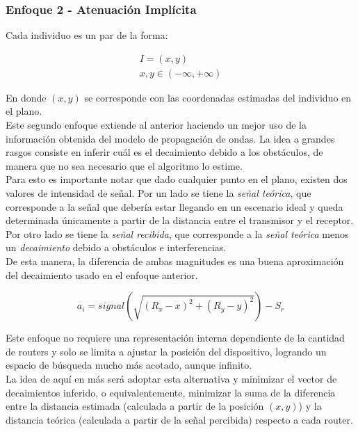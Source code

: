 \documentclass[journal]{IEEEtran}
\begin{document}
\subsubsection{Enfoque 2 - Atenuación Implícita}

Cada individuo es un par de la forma:

\begin{gather*}
I = (x, y)\\
x, y \in (-\infty, +\infty)
\end{gather*}

En donde $(x,y)$ se corresponde con las coordenadas estimadas del individuo en el plano.\\

Este segundo enfoque extiende al anterior haciendo un mejor uso de la información obtenida del modelo de propagación de ondas. La idea a grandes rasgos consiste en inferir cuál es el decaimiento debido a los obstáculos, de manera que no sea necesario que el algoritmo lo estime.\\

Para esto es importante notar que dado cualquier punto en el plano, existen dos valores de intensidad de señal. Por un lado se tiene la \emph{señal teórica}, que corresponde a la señal que debería estar llegando en un escenario ideal y queda determinada únicamente a partir de la distancia entre el transmisor y el receptor. Por otro lado se tiene la \emph{señal recibida}, que corresponde a la \emph{señal teórica} menos un \emph{decaimiento} debido a obstáculos e interferencias.\\

De esta manera, la diferencia de ambas magnitudes es una buena aproximación del decaimiento usado en el enfoque anterior.

$$a_i = signal(\sqrt{(R_x-x)^2+(R_y-y)^2}) - S_r$$

Este enfoque no requiere una representación interna dependiente de la cantidad de routers y solo se limita a ajustar la posición del dispositivo, logrando un espacio de búsqueda mucho más acotado, aunque infinito.\\

La idea de aquí en más será adoptar esta alternativa y minimizar el vector de decaimientos inferido, o equivalentemente, minimizar la suma de la diferencia entre la distancia estimada (calculada a partir de la posición $(x,y)$) y la distancia teórica (calculada a partir de la señal percibida) respecto a cada router.\\
\end{document}
